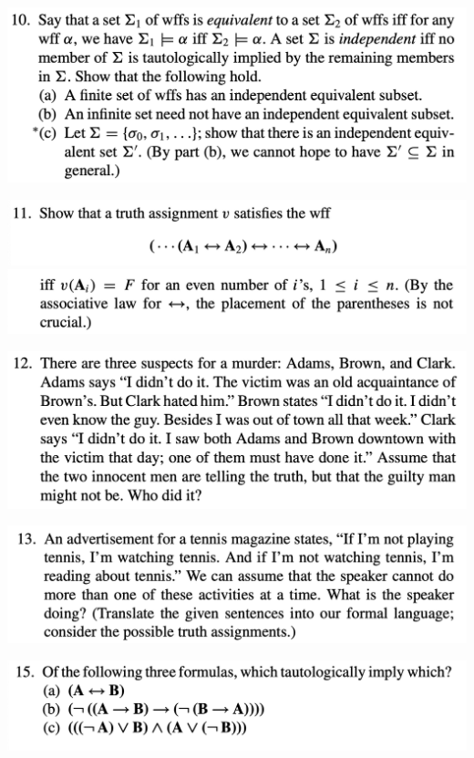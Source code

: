 \includegraphics[width=400pt]{img/logic--berkeley-125a--homework-1-1b3d.png}


\includegraphics[width=400pt]{img/logic--berkeley-125a--homework-1-079f.png}
\includegraphics[width=400pt]{img/logic--berkeley-125a--homework-1-8256.png}


\includegraphics[width=400pt]{img/logic--berkeley-125a--homework-1-2358.png}


\includegraphics[width=400pt]{img/logic--berkeley-125a--homework-1-526e.png}

\includegraphics[width=400pt]{img/logic--berkeley-125a--homework-1-a71f.png}
